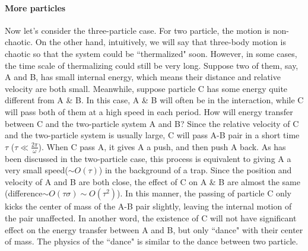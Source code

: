 \documentclass[a4paper,onecolumn,12pt]{article}
\begin{document}
\begin{comment}
\begin{figure}
\subfigure[]{
\begin{minipage}[b]{0.3\textwidth}
\texttt{[image: ../matlab2016/MolecularDynamics/figure/latexpic/freq\_scanE\_1.png]} 
\end{minipage}
}
\subfigure[]{
\begin{minipage}[b]{0.3\textwidth}
\texttt{[image: ../matlab2016/MolecularDynamics/figure/latexpic/freq\_scanE\_2.png]} 
\end{minipage}
}
\subfigure[]{
\begin{minipage}[b]{0.3\textwidth}
\texttt{[image: ../matlab2016/MolecularDynamics/figure/latexpic/freq\_scanE\_3.png]} 
\end{minipage}
}
\centering
\caption{Frequency of relative motion with internal energy in three regime} Numbers in the legend is the value of $\frac{F_0}{m\omega_0^2\sigma}$
\label{fig:thermalization3}
\end{figure}}
\end{comment}


\paragraph{More particles}
Now let's consider the three-particle case. For two particle, the motion is non-chaotic. On the other hand, intuitively, we will say that three-body motion is chaotic so that the system could be ``thermalized" soon. However, in some cases, the time scale of thermalizing could still be very long. Suppose two of them, say, A and B, has small internal energy, which means their distance and relative velocity are both small. Meanwhile, suppose particle C has some energy quite different from A \& B. In this case, A \& B will often be in the interaction, while C will pass both of them at a high speed in each period. How will energy transfer between C and the two-particle system A and B? Since the relative velocity of C and the two-particle system is usually large, C will pass A-B pair in a short time $\tau$ ($\tau\ll\frac{2\pi}{\omega}$). When C pass A, it gives A a push, and then push A back.  As has been discussed in the two-particle case, this process is equivalent to giving A a very small speed($\sim O(\tau)$) in the background of a trap. Since the position and velocity of A and B are both close, the effect of C on A \& B are almost the same (difference$\sim O(\tau\sigma)\sim O(\tau^2)$). In this manner, the passing of particle C only kicks the center of mass of the A-B pair slightly, leaving the internal motion of the pair unaffected. In another word, the existence of C will not have significant effect on the energy transfer between A and B, but only ``dance" with their center of mass. The physics of the ``dance" is similar to the dance between two particle. %
\end{document}
